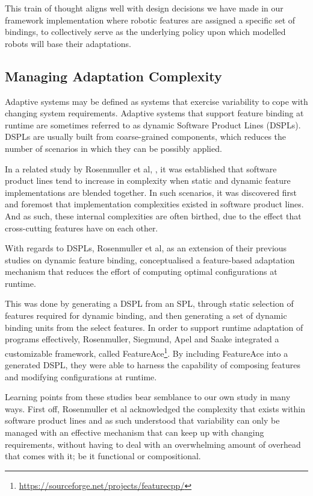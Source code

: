 \documentclass[conference]{IEEEtran}
\newcommand{\foot}[1]{\footnote{\url{#1}}}
\begin{document}
This train of thought aligns well with design decisions we have made in our framework implementation where robotic features are assigned a specific set of bindings, to collectively serve as the underlying policy upon which modelled robots will base their adaptations.
 
\subsection{Managing Adaptation Complexity}
Adaptive systems may be defined as systems that exercise variability to cope with changing system requirements. Adaptive systems that support feature binding at runtime are sometimes referred to as dynamic Software Product Lines (DSPLs). DSPLs are usually built from coarse-grained components, which reduces the number of scenarios in which they can be possibly applied.

In a related study by Rosenmuller et al, \cite{fmod-lang-scenarios}, it was established that software product lines tend to increase in complexity when static and dynamic feature implementations are blended together. In such scenarios, it was discovered first and foremost that implementation complexities existed in software product lines. And as such, these internal complexities are often birthed, due to the effect that cross-cutting features have on each other.

With regards to DSPLs, Rosenmuller et al, as an extension of their previous studies on dynamic feature binding, \cite{tailor-spl} conceptualised a feature-based adaptation mechanism that reduces the effort of computing optimal configurations at runtime.

This was done by generating a DSPL from an SPL, through static selection of features required for dynamic binding, and then generating a set of dynamic binding units from the select features. In order to support runtime adaptation of programs effectively, Rosenmuller, Siegmund, Apel and Saake integrated a customizable framework, called FeatureAce\foot{https://sourceforge.net/projects/featurecpp/}. By including FeatureAce into a generated DSPL, they were able to harness the capability of composing features and modifying configurations at runtime.

Learning points from these studies bear semblance to our own study in many ways. First off, Rosenmuller et al\cite{tailor-spl} acknowledged the complexity that exists within software product lines and as such understood that variability can only be managed with an effective mechanism that can keep up with changing requirements, without having to deal with an overwhelming amount of overhead that comes with it; be it functional or compositional.
\end{document}
